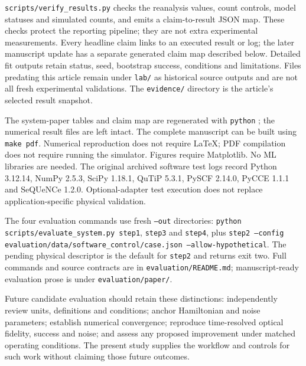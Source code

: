 \documentclass[10pt,a4paper]{article}
\newcommand{\code}[1]{\texttt{#1}}
\begin{document}
\code{scripts/verify\_results.py} checks the reanalysis values, count controls, model statuses and simulated counts, and emits a claim-to-result JSON map. These checks protect the reporting pipeline; they are not extra experimental measurements. Every headline claim links to an executed result or log; the later manuscript update has a separate generated claim map described below. Detailed fit outputs retain status, seed, bootstrap success, conditions and limitations. Files predating this article remain under \code{lab/} as historical source outputs and are not all fresh experimental validations. The \code{evidence/} directory is the article's selected result snapshot.

The system-paper tables and claim map are regenerated with \code{python} ; the numerical result files are left intact. The complete manuscript can be built using \code{make pdf}. Numerical reproduction does not require LaTeX; PDF compilation does not require running the simulator. Figures require Matplotlib. No ML libraries are needed. The original archived software test logs record Python 3.12.14, NumPy 2.5.3, SciPy 1.18.1, QuTiP 5.3.1, PySCF 2.14.0, PyCCE 1.1.1 and SeQUeNCe 1.2.0. Optional-adapter test execution does not replace application-specific physical validation.

The four evaluation commands use fresh \code{--out} directories: \code{python scripts/evaluate\_system.py step1}, \code{step3} and \code{step4}, plus \code{step2 --config evaluation/data/software\_control/case.json --allow-hypothetical}. The pending physical descriptor is the default for \code{step2} and returns exit two. Full commands and source contracts are in \code{evaluation/README.md}; manuscript-ready evaluation prose is under \code{evaluation/paper/}.

Future candidate evaluation should retain these distinctions: independently review units, definitions and conditions; anchor Hamiltonian and noise parameters; establish numerical convergence; reproduce time-resolved optical fidelity, success and noise; and assess any proposed improvement under matched operating conditions. The present study supplies the workflow and controls for such work without claiming those future outcomes.
\clearpage

\clearpage

\end{document}
